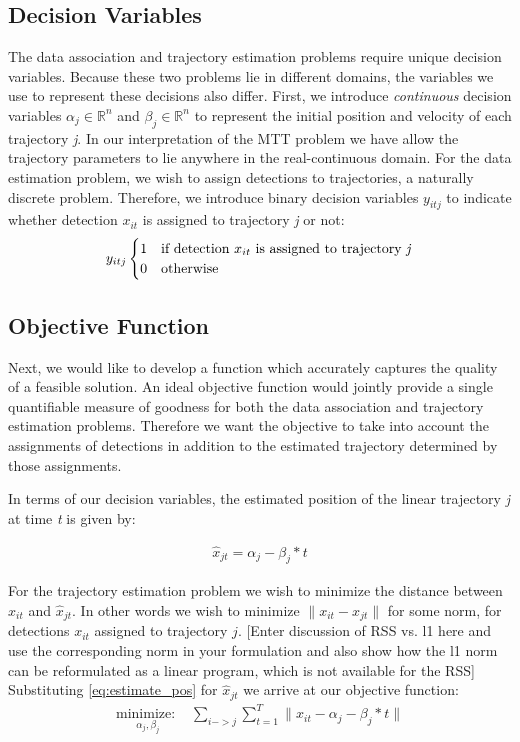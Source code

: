 \documentclass[journal]{IEEEtran}
\begin{document}
\subsection{Decision Variables}
The data association and trajectory estimation problems require unique decision variables. Because these two problems lie in different domains, the variables we use to represent these decisions also differ. First, we introduce \textit{continuous} decision variables $\alpha_{j} \in \mathbb{R}^n$ and $\beta_{j} \in \mathbb{R}^n$ to represent the initial position and velocity of each trajectory \textit{j}.  In our interpretation of the MTT problem we have allow the trajectory parameters to lie anywhere in the real-continuous domain. For the data estimation problem, we wish to assign detections to trajectories, a naturally discrete problem. Therefore, we introduce binary decision variables $y_{itj}$ to indicate whether detection $x_{it}$ is assigned to trajectory \textit{j} or not:
\begin{align}
y_{itj} 
\begin{cases}
1 & \text{if detection $x_{it}$ is assigned to trajectory \textit{j}} \\
0 & \text{otherwise}
\end{cases}
\end{align}

\subsection{Objective Function}
Next, we would like to develop a function which accurately captures the quality of a feasible solution. An ideal objective function would jointly provide a single quantifiable measure of goodness for both the data association and trajectory estimation problems. Therefore we want the objective to take into account the assignments of detections in addition to the estimated trajectory determined by those assignments.

In terms of our decision variables, the estimated position of the linear trajectory \textit{j} at time \textit{t} is given by:

\begin{align}\label{eq:estimate_pos}
	\hat{x}_{jt} =  \alpha_{j} - \beta_{j}*t
\end{align}

For the trajectory estimation problem we wish to minimize the distance between $x_{it}$ and $\hat{x}_{jt}$. In other words we wish to minimize {\color{red}$\|x_{it} - \hat{x}_{jt}\|$ for some norm, for detections $x_{it}$ assigned to trajectory $j$. [Enter discussion of RSS vs. l1 here and use the corresponding norm in your formulation and also show how the l1 norm can be reformulated as a linear program, which is not available for the RSS] }
Substituting \eqref{eq:estimate_pos} for $\hat{x}_{jt}$ we arrive at our objective function:
\begin{align}
\underset{\alpha_{j}, \beta_{j}}{\text{minimize: }} & \sum_{i -> j} \sum_{t=1}^{T} \|x_{it} - \alpha_{j} - \beta_{j}*t\| 
\end{align}
 
\end{document}
